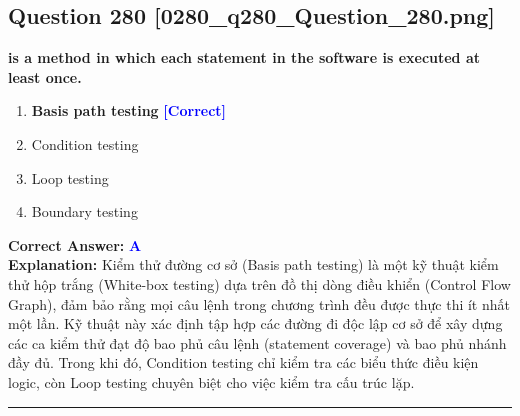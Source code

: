 \documentclass[11pt,a4paper]{article}
\begin{document}
\begin{minipage}{\textwidth}
\subsection*{Question 280 \quad \footnotesize{[0280\_q280\_Question\_280.png]}}
\noindent \textbf{is a method in which each statement in the software is executed at least once.}

\begin{enumerate}[label=\Alph*.]
    \item \textbf{Basis path testing} \hfill \textcolor{blue}{\textbf{[Correct]}}
    \item Condition testing
    \item Loop testing
    \item Boundary testing
\end{enumerate}

\noindent \textbf{Correct Answer:} \textcolor{blue}{\textbf{A}} \\[2pt]
\noindent \textbf{Explanation:} Kiểm thử đường cơ sở (Basis path testing) là một kỹ thuật kiểm thử hộp trắng (White-box testing) dựa trên đồ thị dòng điều khiển (Control Flow Graph), đảm bảo rằng mọi câu lệnh trong chương trình đều được thực thi ít nhất một lần. Kỹ thuật này xác định tập hợp các đường đi độc lập cơ sở để xây dựng các ca kiểm thử đạt độ bao phủ câu lệnh (statement coverage) và bao phủ nhánh đầy đủ. Trong khi đó, Condition testing chỉ kiểm tra các biểu thức điều kiện logic, còn Loop testing chuyên biệt cho việc kiểm tra cấu trúc lặp.

\par\vspace{0.3cm}
\hrule
\vspace{0.3cm}
\end{minipage}
\end{document}
